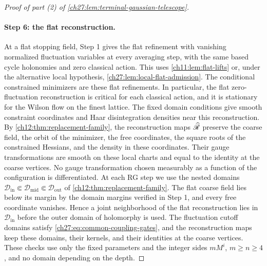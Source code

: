 \begin{proof}[Proof of part (2) of \cref{ch27:lem:terminal-gaussian-telescope}]
\paragraph{Step 6: the flat reconstruction.}
At a flat stopping field, Step 1 gives the flat refinement with vanishing normalized fluctuation variables at every averaging step, with the same based cycle holonomies and zero classical action. This uses \cref{ch11:lem:flat-lifts} or, under the alternative local hypothesis, \cref{ch27:lem:local-flat-admission}. The conditional constrained minimizers are these flat refinements. In particular, the flat zero-fluctuation reconstruction is critical for each classical action, and it is stationary for the Wilson flow on the finest lattice. The fixed domain conditions give smooth constraint coordinates and Haar disintegration densities near this reconstruction. By \cref{ch12:thm:replacement-family}, the reconstruction maps $\widehat{\mathscr R}$ preserve the coarse field, the orbit of the minimizer, the free coordinates, the square roots of the constrained Hessians, and the density in these coordinates. Their gauge transformations are smooth on these local charts and equal to the identity at the coarse vertices. No gauge transformation chosen measurably as a function of the configuration is differentiated. At each RG step we use the nested domains $\mathscr D_{\mathrm{in}}\Subset\mathscr D_{\mathrm{mid}}\Subset\mathscr D_{\mathrm{out}}$ of \cref{ch12:thm:replacement-family}. The flat coarse field lies below its margin by the domain margins verified in Step 1, and every free coordinate vanishes. Hence a joint neighborhood of the flat reconstruction lies in $\mathscr D_{\mathrm{in}}$ before the outer domain of holomorphy is used. The fluctuation cutoff domains satisfy \eqref{ch27:eq:common-coupling-gates}, and the reconstruction maps keep these domains, their kernels, and their identities at the coarse vertices. These checks use only the fixed parameters and the integer sides $mM^i$, $m\ge n\ge4$, and no domain depending on the depth.


\end{proof}
